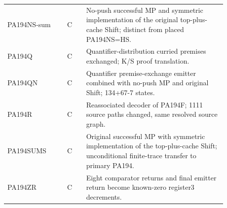\begin{longtable}{@{}p{0.24\linewidth}cp{0.64\linewidth}@{}}
PA194NS-sum & C & No-push successful MP and symmetric implementation of the original top-plus-cache Shift; distinct from placed PA194NS=HS.\\[4pt]
PA194Q & C & Quantifier-distribution curried premises exchanged; K/S proof translation.\\[4pt]
PA194QN & C & Quantifier premise-exchange emitter combined with no-push MP and original Shift; 134+67-7 states.\\[4pt]
PA194R & C & Reassociated decoder of PA194F; 1111 source paths changed, same resolved source graph.\\[4pt]
PA194SUMS & C & Original successful MP with symmetric implementation of the top-plus-cache Shift; unconditional finite-trace transfer to primary PA194.\\[4pt]
PA194ZR & C & Eight comparator returns and final emitter return become known-zero register3 decrements.\\[4pt]
\bottomrule
\end{longtable}
\normalsize
